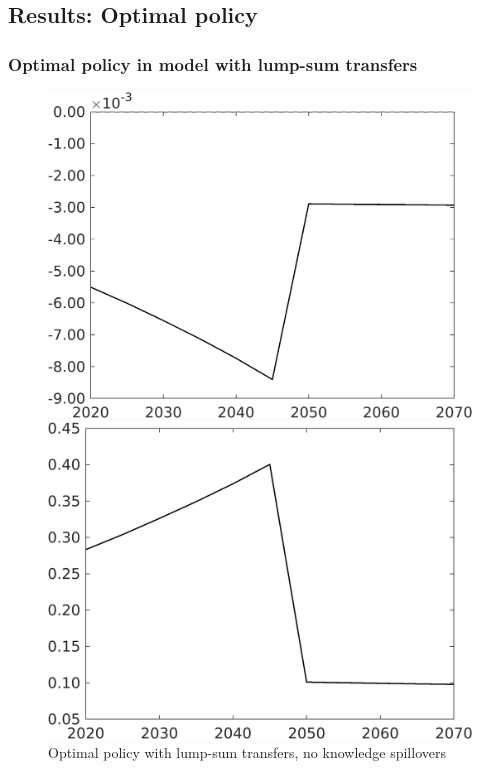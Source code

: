 \clearpage
\subsection{Results: Optimal policy}
\subsubsection{Optimal policy in model with lump-sum transfers}\label{app:TLS}
\begin{figure}[h!!!]
	\centering
	\caption{Optimal policy with lump-sum transfers, no knowledge spillovers
	}\label{fig:opt_TLs_noknow}
	\begin{minipage}[]{0.32\textwidth}
		\includegraphics[width=1\textwidth]{../../codding_model/own_basedOnFried/optimalPol_010922_revision/figures/all_13Sept22_Tplus30/taul_OPT_COMPtaul_regime4_spillover0_knspil1_noskill0_sep0_xgrowth0_PV1_etaa0.79_lgd0.png}
	\end{minipage}
	\begin{minipage}[]{0.32\textwidth}
		\includegraphics[width=1\textwidth]{../../codding_model/own_basedOnFried/optimalPol_010922_revision/figures/all_13Sept22_Tplus30/tauf_OPT_COMPtaulPer_regime4_spillover0_knspil1_noskill0_sep0_xgrowth0_PV1_etaa0.79.png}

\end{minipage}
\end{figure}
